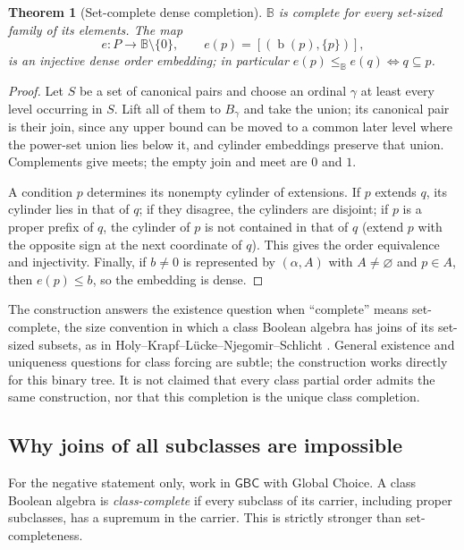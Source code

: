 \documentclass[11pt,letterpaper]{article}
\numberwithin{equation}{section}
\newtheorem{theorem}{Theorem}[section]
\theoremstyle{definition}
\theoremstyle{remark}
\newcommand{\bd}{\operatorname{b}}
\newcommand{\GBC}{\mathsf{GBC}}
\begin{document}
\begin{theorem}[Set-complete dense completion]\label{univ:thm:booleanyes}
$\mathbb B$ is complete for every set-sized family of its elements. The map
\[
 e:P\longrightarrow\mathbb B\setminus\{0\},\qquad
 e(p)=[(\bd(p),\{p\})],
\]
is an injective dense order embedding; in particular
$e(p)\leq_{\mathbb B}e(q)\Leftrightarrow q\subseteq p$.
\end{theorem}
\begin{proof}
Let $S$ be a set of canonical pairs and choose an ordinal $\gamma$ at least
every level occurring in $S$. Lift all of them to $B_\gamma$ and take the union;
its canonical pair is their join, since any upper bound can be moved to a
common later level where the power-set union lies below it, and cylinder
embeddings preserve that union. Complements give meets; the empty join and
meet are $0$ and $1$.

A condition $p$ determines its nonempty cylinder of extensions. If $p$ extends
$q$, its cylinder lies in that of $q$; if they disagree, the cylinders are
disjoint; if $p$ is a proper prefix of $q$, the cylinder of $p$ is not contained
in that of $q$ (extend $p$ with the opposite sign at the next coordinate of
$q$). This gives the order equivalence and injectivity. Finally, if $b\ne0$ is
represented by $(\alpha,A)$ with $A\ne\varnothing$ and $p\in A$, then
$e(p)\leq b$, so the embedding is dense.
\end{proof}

The construction answers the existence question when ``complete'' means
set-complete, the size convention in which a class Boolean algebra has joins of
its set-sized subsets, as in Holy--Krapf--L\"ucke--Njegomir--Schlicht
\cite{HolyEtAl}. General existence and uniqueness questions for class forcing
are subtle; the construction works directly for this binary tree. It is not
claimed that every class partial order admits the same construction, nor that
this completion is the unique class completion.

\subsection{Why joins of all subclasses are impossible}

For the negative statement only, work in $\GBC$ with Global Choice. A class
Boolean algebra is \emph{class-complete} if every subclass of its carrier,
including proper subclasses, has a supremum in the carrier. This is strictly
stronger than set-completeness.
\end{document}
